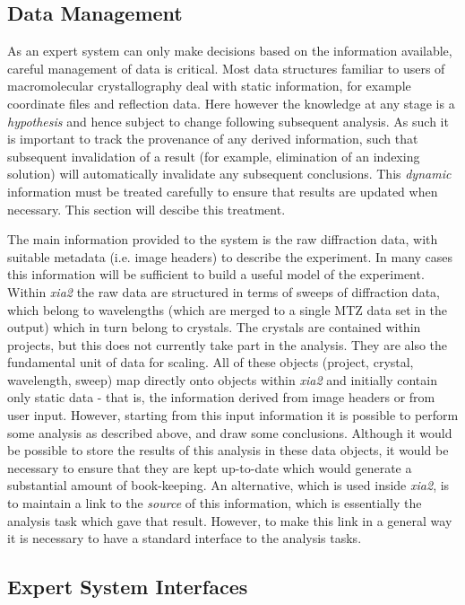 \documentclass[a4paper,11pt]{article}
\begin{document}
\subsection{Data Management}

As an expert system can only make decisions based on the information
available, careful management of data is critical. Most data structures
familiar to users of macromolecular crystallography deal with static
information, for example coordinate files and reflection data. Here
however the knowledge at any stage is a \emph{hypothesis} and hence
subject to change following subsequent analysis. As such it is
important to track the provenance of any derived information, such
that subsequent invalidation of a result (for example, elimination of
an indexing solution) will automatically invalidate any subsequent
conclusions. This \emph{dynamic} information must be treated carefully
to ensure that results are updated when necessary. This section will
descibe this treatment.

The main information provided to the system is the raw diffraction
data, with suitable metadata (i.e. image headers) to describe the
experiment. In many cases this information will be sufficient to build
a useful model of the experiment. Within \emph{xia2} the raw data are
structured in terms of sweeps of diffraction data, which belong to
wavelengths (which are merged to a single MTZ data set in the output)
which in turn belong to crystals. The crystals are contained within
projects, but this does not currently take part in the analysis. They
are also the fundamental unit of data for scaling. All of these
objects (project, crystal, wavelength, sweep) map directly onto
objects within \emph{xia2} and initially contain only static data -
that is, the information derived from image headers or from user
input. However, starting from this input information it is possible to
perform some analysis as described above, and draw some
conclusions. Although it would be possible to store the results of
this analysis in these data objects, it would be necessary to ensure
that they are kept up-to-date which would generate a substantial
amount of book-keeping. An alternative, which is used inside
\emph{xia2}, is to maintain a link to the
\emph{source} of this information, which is essentially the analysis
task which gave that result. However, to make this link in a general
way it is necessary to have a standard interface to the analysis
tasks.

\subsection{Expert System Interfaces}
\end{document}
